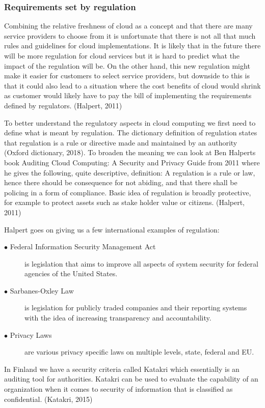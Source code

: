 \documentclass{article}
\begin{document}
\subsubsection{Requirements set by regulation}
Combining the relative freshness of cloud as a concept and that there are many service providers to choose from it is unfortunate that there is not all that much rules and guidelines for cloud implementations.
It is likely that in the future there will be more regulation for cloud services but it is hard to predict what the impact of the regulation will be. On the other hand, this new regulation might make it easier for customers to select service providers, but downside to this is that it could also lead to a situation where the cost benefits of cloud would shrink as customer would likely have to pay the bill of implementing the requirements defined by regulators. (Halpert, 2011)
\par
To better understand the regulatory aspects in cloud computing we first need to define what is meant by regulation.
The dictionary definition of regulation states that regulation is a rule or directive made and maintained by an authority (Oxford dictionary, 2018).
To broaden the meaning we can look at Ben Halperts book Auditing Cloud Computing: A Security and Privacy Guide from 2011 where he gives the following, quite descriptive, definition: A regulation is a rule or law, hence there should be consequence for not abiding, and that there shall be policing in a form of compliance. Basic idea of regulation is broadly protective, for example to protect assets such as stake holder value or citizens. (Halpert, 2011)
\par
Halpert goes on giving us a few international examples of regulation:
\begin{description}
	\item[$\bullet$ Federal Information Security Management Act] is legislation that aims to improve all aspects of system security for federal agencies of the United States.
	\item[$\bullet$ Sarbanes-Oxley Law] is legislation for publicly traded companies and their reporting systems with the idea of increasing transparency and accountability.
	\item[$\bullet$ Privacy Laws] are various privacy specific laws on multiple levels, state, federal and EU.
\end{description}
In Finland we have a security criteria called Katakri which essentially is an auditing tool for authorities. Katakri can be used to evaluate the capability of an organization when it comes to security of information that is classified as confidential. (Katakri, 2015)
\end{document}
